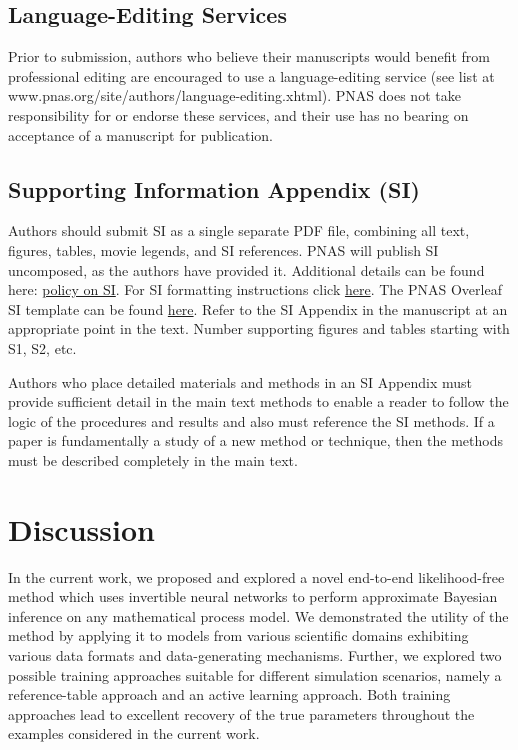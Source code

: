\documentclass[9pt,twoside,lineno]{pnas-new}
\begin{document}
\subsection*{Language-Editing Services}
Prior to submission, authors who believe their manuscripts would benefit from professional editing are encouraged to use a language-editing service (see list at www.pnas.org/site/authors/language-editing.xhtml). PNAS does not take responsibility for or endorse these services, and their use has no bearing on acceptance of a manuscript for publication. 

\subsection*{Supporting Information Appendix (SI)}

Authors should submit SI as a single separate PDF file, combining all text, figures, tables, movie legends, and SI references.  PNAS will publish SI uncomposed, as the authors have provided it.  Additional details can be found here: \href{https://www.pnas.org/page/authors/submission}{policy on SI}.  For SI formatting instructions click \href{https://www.pnascentral.org/cgi-bin/main.plex?form_type=display_auth_si_instructions}{here}.  The PNAS Overleaf SI template can be found \href{https://www.overleaf.com/latex/templates/pnas-template-for-supplementary-information/wqfsfqwyjtsd}{here}.  Refer to the SI Appendix in the manuscript at an appropriate point in the text. Number supporting figures and tables starting with S1, S2, etc.

Authors who place detailed materials and methods in an SI Appendix must provide sufficient detail in the main text methods to enable a reader to follow the logic of the procedures and results and also must reference the SI methods. If a paper is fundamentally a study of a new method or technique, then the methods must be described completely in the main text.

\section*{Discussion}

In the current work, we proposed and explored a novel end-to-end likelihood-free method which uses invertible neural networks to perform approximate Bayesian inference on any mathematical process model. We demonstrated the utility of the method by applying it to models from various scientific domains exhibiting various data formats and data-generating mechanisms. Further, we explored two possible training approaches suitable for different simulation scenarios, namely a reference-table approach and an active learning approach. Both training approaches lead to excellent recovery of the true parameters throughout the examples considered in the current work.
\end{document}
